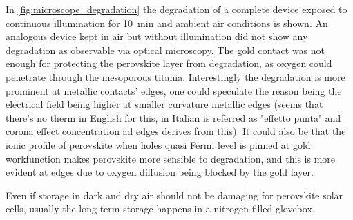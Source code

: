 		In \cref{fig:microscope_degradation} the degradation of a complete device exposed to continuous illumination for \SI{10}{\minute} and ambient air conditions is shown. An analogous device kept in air but without illumination did not show any degradation as observable via optical microscopy. The gold contact was not enough for protecting the perovskite layer from degradation, as oxygen could penetrate through the mesoporous titania. Interestingly the degradation is more prominent at metallic contacts' edges, one could speculate the reason being the electrical field being higher at smaller curvature metallic edges (seems that there's no therm in English for this, in Italian is referred as "effetto punta" and corona effect concentration ad edges derives from this). It could also be that the ionic profile of perovskite when holes quasi Fermi level is pinned at gold workfunction makes perovskite more sensible to degradation, and this is more evident at edges due to oxygen diffusion being blocked by the gold layer.

		Even if storage in dark and dry air should not be damaging for perovskite solar cells, usually the long-term storage happens in a nitrogen-filled glovebox.

